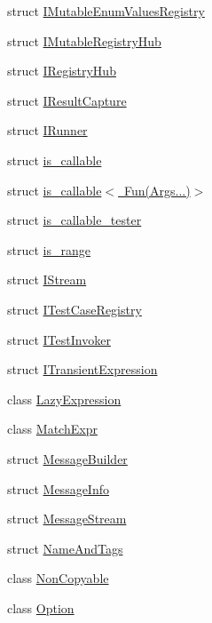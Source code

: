 \begin{DoxyCompactItemize}
struct \mbox{\hyperlink{struct_catch_1_1_i_mutable_enum_values_registry}{I\+Mutable\+Enum\+Values\+Registry}}
\item 
struct \mbox{\hyperlink{struct_catch_1_1_i_mutable_registry_hub}{I\+Mutable\+Registry\+Hub}}
\item 
struct \mbox{\hyperlink{struct_catch_1_1_i_registry_hub}{I\+Registry\+Hub}}
\item 
struct \mbox{\hyperlink{struct_catch_1_1_i_result_capture}{I\+Result\+Capture}}
\item 
struct \mbox{\hyperlink{struct_catch_1_1_i_runner}{I\+Runner}}
\item 
struct \mbox{\hyperlink{struct_catch_1_1is__callable}{is\+\_\+callable}}
\item 
struct \mbox{\hyperlink{struct_catch_1_1is__callable_3_01_fun_07_args_8_8_8_08_4}{is\+\_\+callable$<$ Fun(\+Args...)$>$}}
\item 
struct \mbox{\hyperlink{struct_catch_1_1is__callable__tester}{is\+\_\+callable\+\_\+tester}}
\item 
struct \mbox{\hyperlink{struct_catch_1_1is__range}{is\+\_\+range}}
\item 
struct \mbox{\hyperlink{struct_catch_1_1_i_stream}{I\+Stream}}
\item 
struct \mbox{\hyperlink{struct_catch_1_1_i_test_case_registry}{I\+Test\+Case\+Registry}}
\item 
struct \mbox{\hyperlink{struct_catch_1_1_i_test_invoker}{I\+Test\+Invoker}}
\item 
struct \mbox{\hyperlink{struct_catch_1_1_i_transient_expression}{I\+Transient\+Expression}}
\item 
class \mbox{\hyperlink{class_catch_1_1_lazy_expression}{Lazy\+Expression}}
\item 
class \mbox{\hyperlink{class_catch_1_1_match_expr}{Match\+Expr}}
\item 
struct \mbox{\hyperlink{struct_catch_1_1_message_builder}{Message\+Builder}}
\item 
struct \mbox{\hyperlink{struct_catch_1_1_message_info}{Message\+Info}}
\item 
struct \mbox{\hyperlink{struct_catch_1_1_message_stream}{Message\+Stream}}
\item 
struct \mbox{\hyperlink{struct_catch_1_1_name_and_tags}{Name\+And\+Tags}}
\item 
class \mbox{\hyperlink{class_catch_1_1_non_copyable}{Non\+Copyable}}
\item 
class \mbox{\hyperlink{class_catch_1_1_option}{Option}}
\item 

\end{DoxyCompactItemize}
